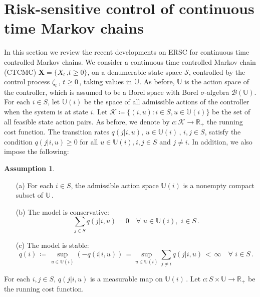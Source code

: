 \documentclass[notitlepage,11pt,reqno]{amsart}
\numberwithin{equation}{section}
\theoremstyle{plain}
\theoremstyle{definition}
\newtheorem{assumption}{Assumption}[section]
\theoremstyle{remark}
\newcommand{\Act}{{\mathds{U}}}
\newcommand{\sB}{{\mathscr{B}}}
\newcommand{\sK}{{\mathscr{K}}}
\newcommand{\cS}{{\mathcal{S}}}     %
\newcommand{\RR}{\mathds{R}} %
\newcommand{\df}{\coloneqq}
\begin{document}
\section{Risk-sensitive control of  continuous time Markov chains}
In this section we review the recent developments on ERSC for continuous time controlled Markov chains. 
We consider a continuous time controlled Markov chain (CTCMC) $\mathbf{X}=\{X_t$\,,$t\ge 0\}$, on a denumerable state space $\cS$, controlled by the control process $\zeta_t$\,, $t\ge 0$\,, taking values in $\Act$.
As before, $\Act$ is the action space of the controller, which is assumed to be a Borel space with Borel $\sigma$-algebra $\sB(\Act)$. For each $i\in S$, let $\Act(i)$ be the space of all admissible actions of the controller when the system is at state $i$.
 Let $\sK \df \{(i,u) : i\in S, u\in \Act(i)\}$ be the set of all feasible state action pairs.
 As before, we denote by $c:\sK \to \RR_{+}$ the running cost function. The transition rates $q(j|i, u)$, $u\in \Act(i)$\,, $i,j\in S$, satisfy the condition $q(j|i,u)\ge 0$ for all $u\in\Act(i), i, j\in S$ and $j\neq i$. In addition,
we also impose the following:
\begin{assumption}\label{A4.1}
\begin{itemize}
\item[(a)] For each $i\in S$, the admissible action space $\Act(i)$ is a nonempty compact subset of $\Act$\,.
\item[(b)] The model is conservative:
\begin{equation*}
\sum_{j\in S} q(j|i,u) = 0\quad\forall\,\, u\in\Act(i),\,\, i\in S\,.
\end{equation*}
\item[(c)] The model is stable: 
\begin{equation*}
q(i) \,\df\, \sup_{u\in\Act(i)} (- q(i|i,u))\,=\sup_{u\in\Act(i)}\sum_{j\neq i} q(j|i, u)\, <\,  \infty\quad\forall \,\, i\in S\,.
\end{equation*}
\end{itemize}
\end{assumption}
For each $i,j\in S$, $q(j|i,u)$ is a measurable map on $\Act(i)$\,. Let $c : S\times\Act\to\RR_{+}$ be the running cost function. 
\end{document}
